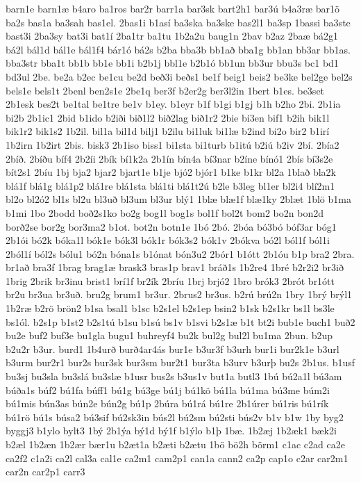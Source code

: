 {barn1e
barn1æ
b4aro
ba1ros
bar2r
barr1a
bar3sk
bart2h1
bar3ú
b4a3ræ
bar1ö
ba2s
bas1a
ba3sah
bas1el.
2bas1i
b1así
ba3ska
ba3ske
bas2l1
ba3sp
1bassi
ba3ste
bast3i
2ba3sy
bat3i
bat1í
2ba1tr
ba1tu
1b2a2u
baug1n
2bav
b2az
2baæ
bá2g1
bá2l
bál1d
bál1e
bál1f4
bár1ó
bá2s
b2ba
bba3b
bb1að
bba1g
bb1an
bb3ar
bb1as.
bba3str
bba1t
bb1b
bb1e
bb1i
b2b1j
bbl1e
b2b1ó
bb1un
bb3ur
bbu3s
bc1
bd1
bd3ul
2be.
be2a
b2ec
be1cu
be2d
beð3i
beðs1
be1f
beig1
beis2
be3ke
bel2ge
bel2s
bels1e
bels1t
2benl
ben2s1e
2be1q
ber3f
b2er2g
ber3l2in
1bert
b1es.
be3set
2b1esk
bes2t
be1tal
be1tre
be1v
b1ey.
b1eyr
b1f
b1gi
b1gj
b1h
b2ho
2bi.
2b1ia
bi2b
2b1ic1
2bid
b1ido
b2iði
bið1l2
bið2lag
bið1r2
2bie
bi3en
bif1
b2ih
bik1l
bik1r2
bik1s2
1b2il.
bil1a
bil1d
bilj1
b2ilu
bi1luk
bi1læ
b2ind
bi2o
bir2
b1irí
1b2irn
1b2irt
2bis.
bisk3
2b1iso
biss1
bi1sta
bi1turb
b1itú
b2iú
b2iv
2bí.
2bía2
2bíð.
2bíðu
bíf4
2b2íi
2bík
bí1k2a
2b1ín
bín4a
bí3nar
b2íne
bínó1
2bís
bí3s2e
bít2s1
2bíu
1bj
bja2
bjar2
bjart1e
b1je
bjó2
bjór1
b1ke
b1kr
bl2a
1blað
bla2k
blá1f
blá1g
blá1p2
blá1re
blá1sta
blá1ti
blá1t2ú
b2le
b3leg
bl1er
bl2i4
blí2m1
bl2o
bl2ó2
bl1s
bl2u
bl3uð
bl3um
bl3ur
blý1
1blæ
blæ1f
blæ1ky
2blæt
1blö
b1ma
b1mi
1bo
2bodd
boð2s1ko
bo2g
bog1l
bog1s
bol1f
bol2t
bom2
bo2n
bon2d
borð2se
bor2g
bor3ma2
b1ot.
bot2n
botn1e
1bó
2bó.
2bóa
bó3bó
bóf3ar
bóg1
2b1ói
bó2k
bóka1l
bók1e
bók3l
bók1r
bók3s2
bók1v
2bókva
bó2l
ból1f
ból1i
2ból1í
ból2s
bólu1
bó2n
bóna1s
b1ónat
bón3u2
2bór1
b1ótt
2b1óu
b1p
bra2
2bra.
br1að
bra3f
1brag
brag1æ
brask3
bras1p
brav1
bráð1s
1b2re4
1bré
b2r2i2
br3ið
1brig
2brik
br3inu
brist1
brí1f
br2ík
2bríu
1brj
brjó2
1bro
brók3
2brót
br1ótt
br2u
br3ua
br3uð.
bru2g
brum1
br3ur.
2brus2
br3us.
b2rú
brú2n
1bry
1brý
brýl1
1b2ræ
b2rö
brön2
b1sa
bsal1
b1sc
b2s1el
b2s1ep
bsin2
b1sk
b2s1kr
bs1l
bs3le
bs1ól.
b2s1p
b1st2
b2s1tú
b1su
b1sú
bs1v
b1svi
b2s1æ
b1t
bt2i
bub1e
buch1
buð2
bu2e
buf2
buf3e
bu1gla
bugu1
buhreyf4
bu2k
bul2g
bul2l
bu1ma
2bun.
b2up
b2u2r
b3ur.
burd1
1b4urð
burð4ar4ás
bur1e
b3ur3f
b3urh
bur1i
bur2k1e
b3url
b3urm
bur2r1
bur2s
bur3sk
bur3sm
bur2t1
bur3ta
b3urv
b3urþ
bu2s
2b1us.
b1usf
bu3sj
bu3sla
bu3slá
bu3slæ
b1usr
bus2s
b3us1v
but1a
butl3
1bú
bú2a1l
bú3am
búða1s
búf2
bú1fa
búff1
bú1g
bú3ge
bú1j
bú1kö
bú1la
bú1ma
bú3me
búm2i
bú1mis
bún3as
bún2e
bún2g
bú1p
2búra
bú1rá
bú1re
2b1úrer
bú1ris
bú1rík
bú1rö
bú1s
búsa2
bú3sif
bú2sk3in
bús2l
bú2sm
bú2sti
bús2v
b1v
b1w
1by
byg2
byggj3
b1ylo
bylt3
1bý
2b1ýa
bý1d
bý1f
b1ýlo
b1þ
1bæ.
1b2æj
1b2æk1
bæk2i
b2æl
1b2æn
1b2ær
bær1u
b2æt1a
b2æti
b2ætu
1bö
bö2h
börm1
c1ac
c2ad
ca2e
ca2f2
c1a2i
ca2l
cal3a
cal1e
ca2m1
cam2p1
can1a
cann2
ca2p
cap1o
c2ar
car2m1
car2n
car2p1
carr3
}
